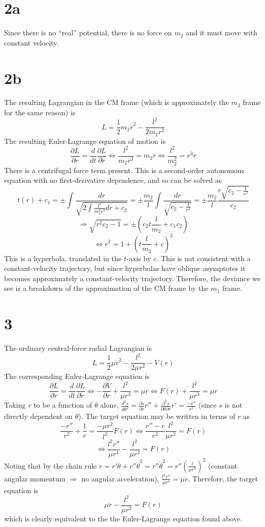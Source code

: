 \documentclass{article}
\begin{document}
\section*{2a}
Since there is no ``real'' potential, there is no force on $m_2$ and it must move with constant velocity. 

\section*{2b}
The resulting Lagrangian in the CM frame (which is approximately the $m_2$ frame for the same reason) is
\[L=\frac{1}{2}m_2\dot{r}^2-\frac{l^2}{2m_2 r^2}\]
The resulting Euler-Lagrange equation of motion is
\[\frac{\partial L}{\partial r}=\frac{d}{dt}\frac{\partial L}{\partial \dot{r}}\Leftrightarrow \frac{l^2}{m_2 r^3}=m_2\ddot{r}\Leftrightarrow \frac{l^2}{m_2^2}=r^3\ddot{r}\]
There is a centrifugal force term present.
This is a second-order autonomous equation with no first-derivative dependence, and so can be solved as
\[t(r)+c_1=\pm\int\frac{dr}{\sqrt{2\int\frac{l^2}{m_2^2 r^3}dr+c_2}}=\pm{\frac{m_2}{l}}\int\frac{dr}{\sqrt{c_2-\frac{1}{r^2}}}=\pm{\frac{m_2}{l}}\frac{r\sqrt{c_2-\frac{1}{r^2}}}{c_2}\]
\[\Rightarrow \sqrt{r^2c_2-{1}}=\pm\left(c_2t{\frac{l}{m_2}}+c_1c_2\right)\]
\[\Leftrightarrow r^2={1+\left( t{\frac{l}{m_2}}+c \right)^2}\]
This is a hyperbola, translated in the $t$-axis by $c$. This is not consistent with a constant-velocity trajectory, but since hyperbolas have oblique asymptotes it becomes approximately a constant-velocity trajectory. Therefore, the deviance we see is a breakdown of the approximation of the CM frame by the $m_1$ frame.

\section*{3}
The ordinary central-force radial Lagrangian is
\[L=\frac{1}{2}\mu\dot{r}^2-\frac{l^2}{2\mu r^2}-V(r)\]
The corresponding Euler-Lagrange equation is
\[\frac{\partial L}{\partial r}=\frac{d}{dt}\frac{\partial L}{\partial \dot{r}}\Leftrightarrow -\frac{\partial V}{\partial r}+\frac{l^2}{\mu r^3}=\mu\ddot{r}\Leftrightarrow F(r)+\frac{l^2}{\mu r^3}=\mu\ddot{r}\]
Taking $r$ to be a function of $\theta$ alone, $\frac{d^2s}{d\theta^2}=\frac{\partial s}{\partial r}r''+\frac{\partial^2s}{\partial\theta\partial r}r'=\frac{-r''}{r^2}$ (since $s$ is not directly dependent on $\theta$). The target equation may be written in terms of $r$ as
\[\frac{-r''}{r^2}+\frac{1}{r}=\frac{-\mu r^2}{l^2}F(r)\Leftrightarrow \frac{r''-r}{r^2}\frac{l^2}{\mu r^2}=F(r)
\]\[\Leftrightarrow \frac{l^2r''}{\mu r^4}-\frac{l^2}{\mu r^3}=F(r)\]
Noting that by the chain rule $\ddot{r}=r'\ddot{\theta}+r''\dot{\theta}^2=r''\dot{\theta}^2=r''\left(\frac{l}{\mu r^2}\right)^2$ (constant angular momentum $\Rightarrow$ no angular acceleration), $\frac{l^2r''}{\mu r^4}=\mu \ddot{r}$. Therefore, the target equation is
\[\mu\ddot{r}-\frac{l^2}{\mu r^3}=F(r)\]
which is clearly equivalent to the the Euler-Lagrange equation found above. 
\end{document}

